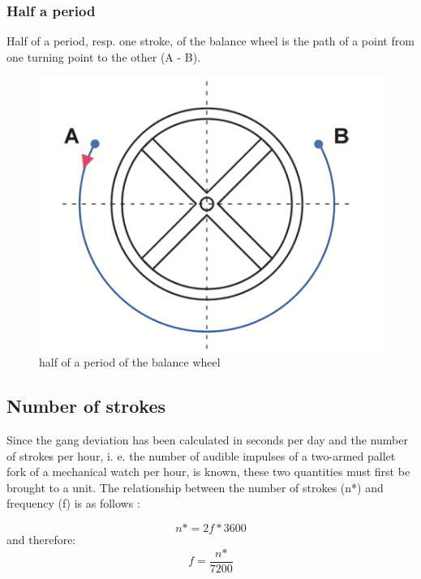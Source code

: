 \documentclass[12pt, a4paper]{report}
\begin{document}
\subsubsection{Half a period}
Half of a period, resp. one stroke, of the balance wheel is the path of a point from one turning point to the other (A - B). \cite{Witschi_basics}
    \begin{figure}[H]
    \centering
    \includegraphics[scale=0.4]{Images/Halfperiod.png}
    
    \caption{half of a period of the balance wheel \cite{Witschi_basics}}
    \end{figure}
\bigskip
    
    \subsection{Number of strokes}
    Since the gang deviation has been calculated in seconds per day and the number of strokes per hour, i. e. the number of audible impulses of a two-armed pallet fork of a mechanical watch per hour, is known, these two quantities must first be brought to a unit. The relationship between the number of strokes (n*) and frequency (f) is as follows \cite{Krug1987}: 
    
    \begin{displaymath}
    n\text{*} = 2f*3600
     \end{displaymath}
     and therefore:
     \begin{displaymath}
      f = \frac{n\text{*}}{7200}
     \end{displaymath}
     
\end{document}
